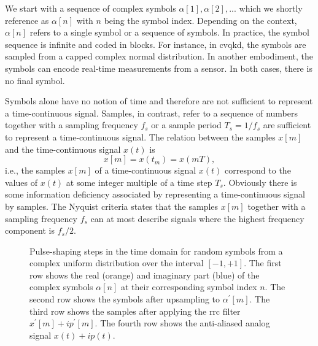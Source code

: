 We start with a sequence of complex symbols $\alpha[1],\alpha[2],...$ which we shortly reference as $\alpha[n]$ with $n$ being the symbol index.
Depending on the context, $\alpha[n]$ refers to a single symbol or a sequence of symbols.
In practice, the symbol sequence is infinite and coded in blocks.
For instance, in \gls{cvqkd}, the symbols are sampled from a capped complex normal distribution.
In another embodiment, the symbols can encode real-time measurements from a sensor.
In both cases, there is no final symbol.

Symbols alone have no notion of time and therefore are not sufficient to represent a time-continuous signal.
Samples, in contrast, refer to a sequence of numbers together with a sampling frequency $f_s$ or a sample period $T_s=1/f_s$ are sufficient to represent a time-continuous signal.
The relation between the samples $x[m]$ and the time-continuous signal $x(t)$ is
\begin{equation}
	x[m]
	=
	x(t_m)
	=
	x(mT)
	,
\end{equation}
i.e., the samples $x[m]$ of a time-continuous signal $x(t)$ correspond to the values of $x(t)$ at some integer multiple of a time step $T_s$.
Obviously there is some information deficiency associated by representing a time-continuous signal by samples.
The Nyquist criteria states that the samples $x[m]$ together with a sampling frequency $f_s$ can at most describe signals where the highest frequency component is $f_s/2$.

\begin{figure}[htb]
	\centering
	
	\caption{Pulse-shaping steps in the time domain for random symbols from a complex uniform distribution over the interval $[-1,+1]$. The first row shows the real (orange) and imaginary part (blue) of the complex symbols $\alpha[n]$ at their corresponding symbol index $n$. The second row shows the symbols after upsampling to $\alpha^\prime[m]$. The third row shows the samples after applying the \gls{rrc} filter $x^\prime[m]+ip^\prime[m]$. The fourth row shows the anti-aliased analog signal $x(t)+ip(t)$.}\label{fig:pulse_shaping_rand_time}
\end{figure}

